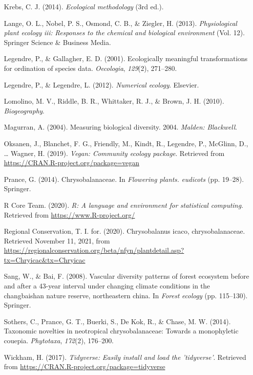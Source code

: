 \documentclass[11pt,]{article}
\begin{document}
\hypertarget{ref-krebs1999ecological}{}
Krebs, C. J. (2014). \emph{Ecological methodology} (3rd ed.).

\hypertarget{ref-lange2013physiological}{}
Lange, O. L., Nobel, P. S., Osmond, C. B., \& Ziegler, H. (2013).
\emph{Physiological plant ecology iii: Responses to the chemical and
biological environment} (Vol. 12). Springer Science \& Business Media.

\hypertarget{ref-legendre2001ecologically}{}
Legendre, P., \& Gallagher, E. D. (2001). Ecologically meaningful
transformations for ordination of species data. \emph{Oecologia},
\emph{129}(2), 271--280.

\hypertarget{ref-legendre2012numerical}{}
Legendre, P., \& Legendre, L. (2012). \emph{Numerical ecology}.
Elsevier.

\hypertarget{ref-lomolino2017biogeography}{}
Lomolino, M. V., Riddle, B. R., Whittaker, R. J., \& Brown, J. H.
(2010). \emph{Biogeography}.

\hypertarget{ref-magurran2004measuring}{}
Magurran, A. (2004). Measuring biological diversity. 2004. \emph{Malden:
Blackwell}.

\hypertarget{ref-veganR}{}
Oksanen, J., Blanchet, F. G., Friendly, M., Kindt, R., Legendre, P.,
McGlinn, D., \ldots{} Wagner, H. (2019). \emph{Vegan: Community ecology
package}. Retrieved from \url{https://CRAN.R-project.org/package=vegan}

\hypertarget{ref-prance2014chrysobalanaceae}{}
Prance, G. (2014). Chrysobalanaceae. In \emph{Flowering plants.
eudicots} (pp. 19--28). Springer.

\hypertarget{ref-RStudio}{}
R Core Team. (2020). \emph{R: A language and environment for statistical
computing}. Retrieved from \url{https://www.R-project.org/}

\hypertarget{ref-ircCicaco}{}
Regional Conservation, T. I. for. (2020). Chrysobalanus icaco,
chrysobalanaceae. Retrieved November 11, 2021, from
\url{https://regionalconservation.org/beta/nfyn/plantdetail.asp?tx=Chryicac\&tx=Chryicac}

\hypertarget{ref-sang2008vascular}{}
Sang, W., \& Bai, F. (2008). Vascular diversity patterns of forest
ecosystem before and after a 43-year interval under changing climate
conditions in the changbaishan nature reserve, northeastern china. In
\emph{Forest ecology} (pp. 115--130). Springer.

\hypertarget{ref-sothers2014taxonomic}{}
Sothers, C., Prance, G. T., Buerki, S., De Kok, R., \& Chase, M. W.
(2014). Taxonomic novelties in neotropical chrysobalanaceae: Towards a
monophyletic couepia. \emph{Phytotaxa}, \emph{172}(2), 176--200.

\hypertarget{ref-tidyverseR}{}
Wickham, H. (2017). \emph{Tidyverse: Easily install and load the
'tidyverse'}. Retrieved from
\url{https://CRAN.R-project.org/package=tidyverse}




\newpage
\singlespacing 
\end{document}
